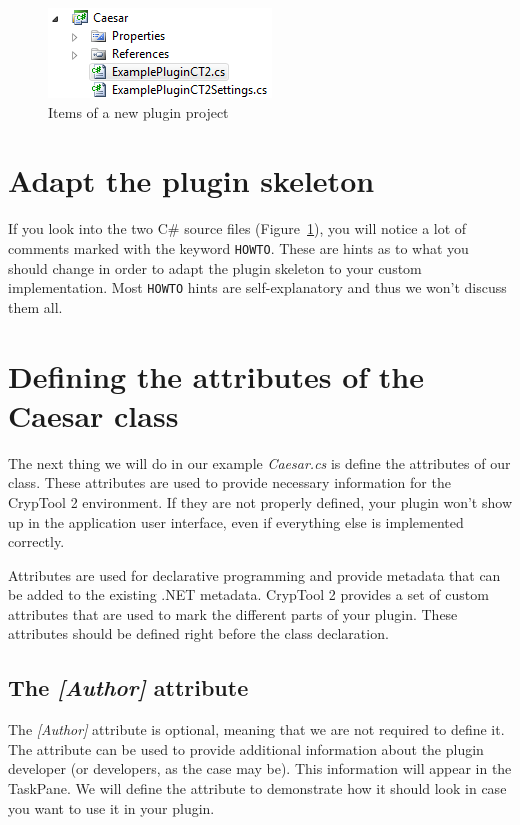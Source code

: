 \begin{figure}[h!]
	\centering
		\includegraphics{figures/caesar_project.png}
	\caption{Items of a new plugin project}
	\label{fig:caesar_project}
\end{figure}

\section{Adapt the plugin skeleton}
\label{AdaptingThePluginSkeleton}

If you look into the two C\# source files (Figure~\ref{fig:caesar_project}), you will notice a lot of comments marked with the keyword \texttt{HOWTO}. These are hints as to what you should change in order to adapt the plugin skeleton to your custom implementation. Most \texttt{HOWTO} hints are self-explanatory and thus we won't discuss them all.

\section{Defining the attributes of the Caesar class}
\label{sec:DefiningTheAttributesOfTheCaesarClass}

The next thing we will do in our example \textit{Caesar.cs} is define the attributes of our class. These attributes are used to provide necessary information for the CrypTool 2 environment. If they are not properly defined, your plugin won't show up in the application user interface, even if everything else is implemented correctly.

Attributes are used for declarative programming and provide metadata that can be added to the existing .NET metadata. CrypTool 2 provides a set of custom attributes that are used to mark the different parts of your plugin. These attributes should be defined right before the class declaration.

\subsection{The \protect\textit{[Author]} attribute}
\label{sec:TheAuthorAttribute}

The \textit{[Author]} attribute is optional, meaning that we are not required to define it. The attribute can be used to provide additional information about the plugin developer (or developers, as the case may be). This information will appear in the TaskPane. We will define the attribute to demonstrate how it should look in case you want to use it in your plugin.

